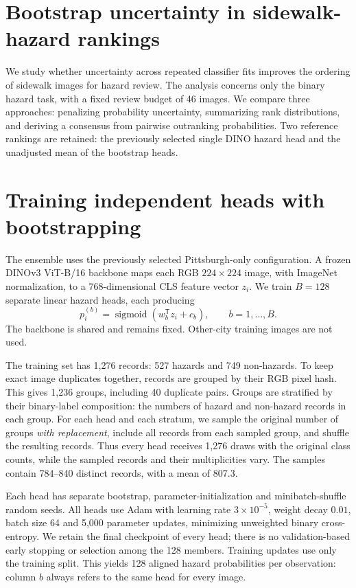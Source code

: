 \documentclass[10pt,a4paper]{article}
\begin{document}
\section*{Bootstrap uncertainty in sidewalk-hazard rankings}

We study whether uncertainty across repeated classifier fits improves the ordering
of sidewalk images for hazard review. The analysis concerns only the binary
hazard task, with a fixed review budget of 46 images. We compare three approaches:
penalizing probability uncertainty, summarizing rank distributions, and deriving
a consensus from pairwise outranking probabilities. Two reference rankings are
retained: the previously selected single DINO hazard head and the unadjusted mean
of the bootstrap heads.

\section{Training independent heads with bootstrapping}
\label{sec:training}
The ensemble uses the previously selected Pittsburgh-only configuration. A frozen
DINOv3 ViT-B/16 backbone maps each RGB $224\times224$ image, with ImageNet
normalization, to a 768-dimensional CLS feature vector $z_i$. We train $B=128$
separate linear hazard heads, each producing
\begin{equation}
p_i^{(b)}=\operatorname{sigmoid}\!\left(w_b^{\mathsf T}z_i+c_b\right),
\qquad b=1,\ldots,B.
\end{equation}
The backbone is shared and remains fixed. Other-city training images are not used.

The training set has 1,276 records: 527 hazards and 749 non-hazards. To keep exact
image duplicates together, records are grouped by their RGB pixel hash. This
gives 1,236 groups, including 40 duplicate pairs. Groups are stratified by their
binary-label composition: the numbers of hazard and non-hazard records in each
group. For each head and each stratum, we sample the original number of groups
\emph{with replacement}, include all records from each sampled group, and shuffle
the resulting records. Thus every head receives 1,276 draws with the original
class counts, while the sampled records and their multiplicities vary. The
samples contain 784--840 distinct records, with a mean of 807.3.

Each head has separate bootstrap, parameter-initialization and minibatch-shuffle
random seeds. All heads use Adam with learning rate $3\times10^{-5}$, weight decay
$0.01$, batch size 64 and 5,000 parameter updates, minimizing unweighted binary
cross-entropy. We retain the final checkpoint of every head; there is no
validation-based early stopping or selection among the 128 members. Training
updates use only the training split. This yields 128 aligned hazard probabilities
per observation: column $b$ always refers to the same head for every image.
\end{document}
